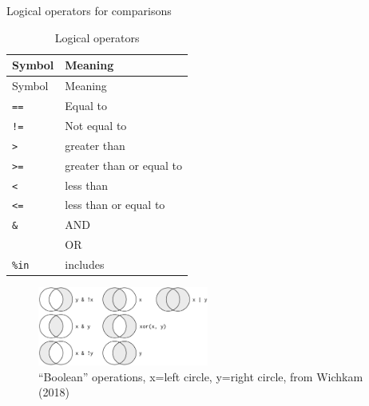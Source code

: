 \documentclass[8pt,ignorenonframetext,]{beamer}
\begin{document}
\begin{frame}[fragile]{Logical operators for comparisons}

\begin{longtable}[]{@{}ll@{}}
\caption{Logical operators}\tabularnewline
\toprule
Symbol & Meaning\tabularnewline
\midrule
\endfirsthead
\toprule
Symbol & Meaning\tabularnewline
\midrule
\endhead
\texttt{==} & Equal to\tabularnewline
\texttt{!=} & Not equal to\tabularnewline
\texttt{\textgreater{}} & greater than\tabularnewline
\texttt{\textgreater{}=} & greater than or equal to\tabularnewline
\texttt{\textless{}} & less than\tabularnewline
\texttt{\textless{}=} & less than or equal to\tabularnewline
\texttt{\&} & AND\tabularnewline
\texttt{\textbar{}} & OR\tabularnewline
\texttt{\%in} & includes\tabularnewline
\bottomrule
\end{longtable}

\medskip 

\begin{figure}
\centering
\includegraphics[width=0.50000\textwidth]{transform-logical.png}
\caption{``Boolean'' operations, x=left circle, y=right circle, from
Wichkam (2018)}
\end{figure}

\end{frame}
\end{document}
